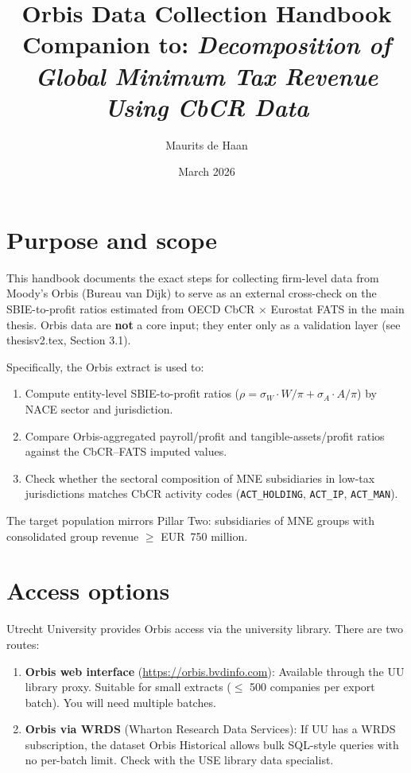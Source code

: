 \documentclass[11pt,a4paper]{article}
\title{\textbf{Orbis Data Collection Handbook}\\[0.5em]
  \large Companion to: \textit{Decomposition of Global Minimum Tax Revenue Using CbCR Data}}
\author{Maurits de Haan}
\date{March 2026}
\newcommand{\field}[1]{\texttt{#1}}
\newcommand{\menu}[1]{\textsf{#1}}
\begin{document}
\maketitle
\tableofcontents
\newpage

\section{Purpose and scope}\label{sec:purpose}

This handbook documents the exact steps for collecting firm-level data from Moody's Orbis (Bureau van Dijk) to serve as an external cross-check on the SBIE-to-profit ratios estimated from OECD CbCR $\times$ Eurostat FATS in the main thesis. Orbis data are \textbf{not} a core input; they enter only as a validation layer (see thesisv2.tex, Section 3.1).

Specifically, the Orbis extract is used to:
\begin{enumerate}[noitemsep]
  \item Compute entity-level SBIE-to-profit ratios ($\rho = \sigma_W \cdot W/\pi + \sigma_A \cdot A/\pi$) by NACE sector and jurisdiction.
  \item Compare Orbis-aggregated payroll/profit and tangible-assets/profit ratios against the CbCR--FATS imputed values.
  \item Check whether the sectoral composition of MNE subsidiaries in low-tax jurisdictions matches CbCR activity codes (\field{ACT\_HOLDING}, \field{ACT\_IP}, \field{ACT\_MAN}).
\end{enumerate}

The target population mirrors Pillar Two: subsidiaries of MNE groups with consolidated group revenue $\geq$ EUR~750 million.

\section{Access options}\label{sec:access}

Utrecht University provides Orbis access via the university library. There are two routes:

\begin{enumerate}[noitemsep]
  \item \textbf{Orbis web interface} (\url{https://orbis.bvdinfo.com}): Available through the UU library proxy. Suitable for small extracts ($\leq$ 500 companies per export batch). You will need multiple batches.
  \item \textbf{Orbis via WRDS} (Wharton Research Data Services): If UU has a WRDS subscription, the dataset \menu{Orbis Historical} allows bulk SQL-style queries with no per-batch limit. Check with the USE library data specialist.
\end{enumerate}
\end{document}
